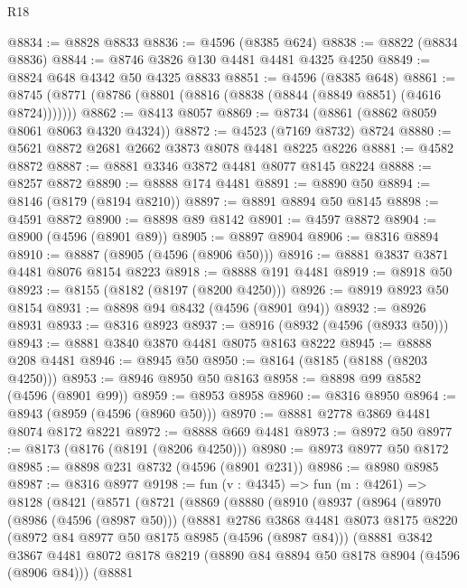 \begin{lexlean}{R18}
\begin{coremodule}
@8834 := @8828 @8833
@8836 := @4596 (@8385 @624)
@8838 := @8822 (@8834 @8836)
@8844 := @8746 @3826 @130 @4481 @4481 @4325 @4250
@8849 := @8824 @648 @4342 @50 @4325 @8833
@8851 := @4596 (@8385 @648)
@8861 := @8745 (@8771 (@8786 (@8801 (@8816 (@8838 (@8844 (@8849 @8851) (@4616 @8724)))))))
@8862 := @8413 @8057
@8869 := @8734 (@8861 (@8862 @8059 @8061 @8063 @4320 @4324))
@8872 := @4523 (@7169 @8732) @8724
@8880 := @5621 @8872 @2681 @2662 @3873 @8078 @4481 @8225 @8226
@8881 := @4582 @8872
@8887 := @8881 @3346 @3872 @4481 @8077 @8145 @8224
@8888 := @8257 @8872
@8890 := @8888 @174 @4481
@8891 := @8890 @50
@8894 := @8146 (@8179 (@8194 @8210))
@8897 := @8891 @8894 @50 @8145
@8898 := @4591 @8872
@8900 := @8898 @89 @8142
@8901 := @4597 @8872
@8904 := @8900 (@4596 (@8901 @89))
@8905 := @8897 @8904
@8906 := @8316 @8894
@8910 := @8887 (@8905 (@4596 (@8906 @50)))
@8916 := @8881 @3837 @3871 @4481 @8076 @8154 @8223
@8918 := @8888 @191 @4481
@8919 := @8918 @50
@8923 := @8155 (@8182 (@8197 (@8200 @4250)))
@8926 := @8919 @8923 @50 @8154
@8931 := @8898 @94 @8432 (@4596 (@8901 @94))
@8932 := @8926 @8931
@8933 := @8316 @8923
@8937 := @8916 (@8932 (@4596 (@8933 @50)))
@8943 := @8881 @3840 @3870 @4481 @8075 @8163 @8222
@8945 := @8888 @208 @4481
@8946 := @8945 @50
@8950 := @8164 (@8185 (@8188 (@8203 @4250)))
@8953 := @8946 @8950 @50 @8163
@8958 := @8898 @99 @8582 (@4596 (@8901 @99))
@8959 := @8953 @8958
@8960 := @8316 @8950
@8964 := @8943 (@8959 (@4596 (@8960 @50)))
@8970 := @8881 @2778 @3869 @4481 @8074 @8172 @8221
@8972 := @8888 @669 @4481
@8973 := @8972 @50
@8977 := @8173 (@8176 (@8191 (@8206 @4250)))
@8980 := @8973 @8977 @50 @8172
@8985 := @8898 @231 @8732 (@4596 (@8901 @231))
@8986 := @8980 @8985
@8987 := @8316 @8977
@9198 := fun (v : @4345) =>
  fun (m : @4261) =>
  @8128
    (@8421
      (@8571
        (@8721
          (@8869
            (@8880
              (@8910
                (@8937
                  (@8964
                    (@8970
                      (@8986 (@4596 (@8987 @50)))
                      (@8881
                        @2786
                        @3868
                        @4481
                        @8073
                        @8175
                        @8220
                        (@8972 @84 @8977 @50 @8175 @8985 (@4596 (@8987 @84)))
                        (@8881
                          @3842
                          @3867
                          @4481
                          @8072
                          @8178
                          @8219
                          (@8890 @84 @8894 @50 @8178 @8904 (@4596 (@8906 @84)))
                          (@8881

\end{coremodule}
\end{lexlean}

